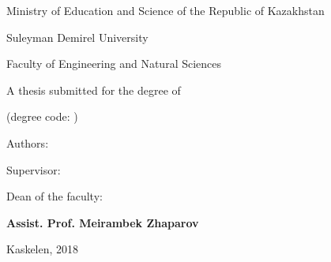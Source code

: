 \newpage
\pagestyle{empty}

\begin{center}
\large
Ministry of Education and Science of the Republic of Kazakhstan

Suleyman Demirel University

Faculty of Engineering and Natural Sciences

\vspace{2cm}
\textbf{\mytitle}

\vspace{1cm}
\large
A thesis submitted for the degree of

\mydegree

(degree code: \mydegreecode)

\vspace{2cm}
Authors: \textbf{\myauthor}

\vspace{2cm}
Supervisor: \textbf{\mycoach}

\vspace{2cm}
Dean of the faculty:

\textbf{Assist. Prof. Meirambek Zhaparov}


\vfill
Kaskelen, 2018
\end{center}
